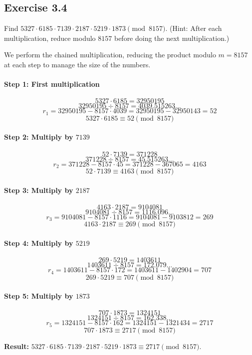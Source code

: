 \subsection*{Exercise 3.4}
Find $5327 \cdot 6185 \cdot 7139 \cdot 2187 \cdot 5219 \cdot 1873 \pmod{8157}$.
(Hint: After each multiplication, reduce modulo $8157$ before doing the next multiplication.)

\begin{solution}
We perform the chained multiplication, reducing the product modulo $m=8157$ at each step to manage the size of the numbers.

\paragraph{Step 1: First multiplication}
$$ 5327 \cdot 6185 = 32950195 $$
$$ 32950195 \div 8157 = 4039.515263... $$
$$ r_1 = 32950195 - 8157 \cdot 4039 = 32950195 - 32950143 = 52 $$
$$ 5327 \cdot 6185 \equiv 52 \pmod{8157} $$

\paragraph{Step 2: Multiply by $7139$}
$$ 52 \cdot 7139 = 371228 $$
$$ 371228 \div 8157 = 45.515263... $$
$$ r_2 = 371228 - 8157 \cdot 45 = 371228 - 367065 = 4163 $$
$$ 52 \cdot 7139 \equiv 4163 \pmod{8157} $$

\paragraph{Step 3: Multiply by $2187$}
$$ 4163 \cdot 2187 = 9104081 $$
$$ 9104081 \div 8157 = 1116.096... $$
$$ r_3 = 9104081 - 8157 \cdot 1116 = 9104081 - 9103812 = 269 $$
$$ 4163 \cdot 2187 \equiv 269 \pmod{8157} $$

\paragraph{Step 4: Multiply by $5219$}
$$ 269 \cdot 5219 = 1403611 $$
$$ 1403611 \div 8157 = 172.079... $$
$$ r_4 = 1403611 - 8157 \cdot 172 = 1403611 - 1402904 = 707 $$
$$ 269 \cdot 5219 \equiv 707 \pmod{8157} $$

\paragraph{Step 5: Multiply by $1873$}
$$ 707 \cdot 1873 = 1324151 $$
$$ 1324151 \div 8157 = 162.338... $$
$$ r_5 = 1324151 - 8157 \cdot 162 = 1324151 - 1321434 = 2717 $$
$$ 707 \cdot 1873 \equiv 2717 \pmod{8157} $$

\textbf{Result:} $5327 \cdot 6185 \cdot 7139 \cdot 2187 \cdot 5219 \cdot 1873 \equiv 2717 \pmod{8157}$.
\end{solution}

